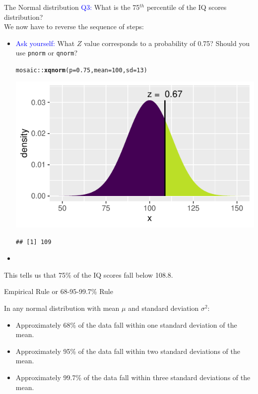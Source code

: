 \documentclass[10pt]{beamer}\usepackage[]{graphicx}\usepackage[]{color}
\makeatletter
\newcommand{\hlnum}[1]{\textcolor[rgb]{0.686,0.059,0.569}{#1}}%
\newcommand{\hlopt}[1]{\textcolor[rgb]{0,0,0}{#1}}%
\newcommand{\hlstd}[1]{\textcolor[rgb]{0.345,0.345,0.345}{#1}}%
\newcommand{\hlkwc}[1]{\textcolor[rgb]{0.333,0.667,0.333}{#1}}%
\newcommand{\hlkwd}[1]{\textcolor[rgb]{0.737,0.353,0.396}{\textbf{#1}}}%
\newenvironment{kframe}{%
 \def\at@end@of@kframe{}%
 \ifinner\ifhmode%
  \def\at@end@of@kframe{\end{minipage}}%
  \begin{minipage}{\columnwidth}%
 \fi\fi%
 \def\FrameCommand##1{\hskip\@totalleftmargin \hskip-\fboxsep
 \colorbox{shadecolor}{##1}\hskip-\fboxsep
     \hskip-\linewidth \hskip-\@totalleftmargin \hskip\columnwidth}%
 \MakeFramed {\advance\hsize-\width
   \@totalleftmargin\z@ \linewidth\hsize
   \@setminipage}}%
 {\par\unskip\endMakeFramed%
 \at@end@of@kframe}
\newenvironment{knitrout}{}{} %
\makeatother
\begin{document}
\begin{frame}[fragile]{The Normal distribution}
	\textcolor{blue}{Q3:}
	What is the 75$^{th}$ percentile of the IQ scores distribution? \\
	We now have to reverse the sequence of steps: \pause
	\begin{itemize}
		\item \textcolor{blue}{Ask yourself:} What $Z$ value corresponds to a probability of 0.75? Should you use \texttt{pnorm} or \texttt{qnorm}? \pause
		
\begin{knitrout}\tiny
{}\color{fgcolor}\begin{kframe}
\begin{alltt}
\hlstd{mosaic}\hlopt{::}\hlkwd{xqnorm}\hlstd{(}\hlkwc{p} \hlstd{=} \hlnum{0.75}\hlstd{,} \hlkwc{mean} \hlstd{=} \hlnum{100}\hlstd{,} \hlkwc{sd} \hlstd{=} \hlnum{13}\hlstd{)}
\end{alltt}
\end{kframe}

{\centering \includegraphics[width=0.6\linewidth]{figure/probs8-1} 

}


\begin{kframe}\begin{verbatim}
## [1] 109
\end{verbatim}
\end{kframe}
\end{knitrout}
		
		\item[]
	\end{itemize} This tells us that 75\% of the IQ scores fall below 108.8. 
\end{frame}


\begin{frame}[fragile]{Empirical Rule or 68-95-99.7\% Rule}
	
	In any normal distribution with mean $\mu$ and standard deviation $\sigma^2$:
	\begin{itemize}
		\setlength\itemsep{2em}
		\item Approximately 68\% of the data fall within one standard deviation of the mean.
		\item Approximately 95\% of the data fall within two standard deviations of the mean.
		\item Approximately 99.7\% of the data fall within three standard deviations of the mean.
	\end{itemize}
\end{frame}
\end{document}
